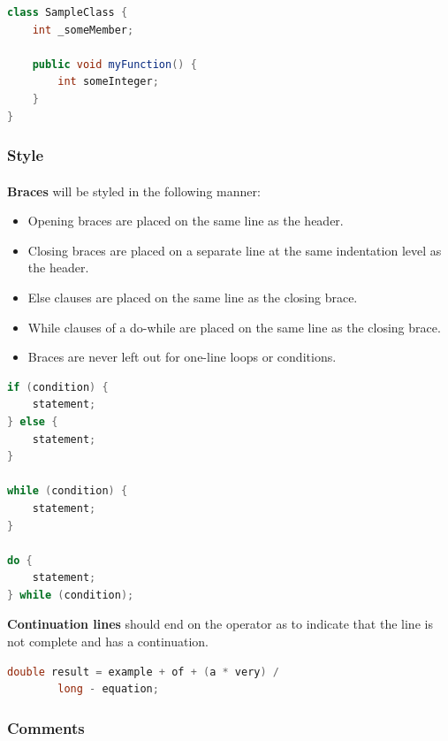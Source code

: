 \documentclass{article}
\begin{document}
    \begin{lstlisting}[language=java]
class SampleClass {
    int _someMember;

    public void myFunction() {
        int someInteger;
    }
}
    \end{lstlisting}

    \subsubsection{Style}
    \label{sec:cs-st}

    \paragraph{}
    \textbf{Braces} will be styled in the following manner:
    \begin{itemize}
        \item Opening braces are placed on the same line as the header.
        \item Closing braces are placed on a separate line at the same
                indentation level as the header.
        \item Else clauses are placed on the same line as the closing brace.
        \item While clauses of a do-while are placed on the same line as the
                closing brace.
        \item Braces are never left out for one-line loops or conditions.
    \end{itemize}

    \begin{lstlisting}[language=Java]
if (condition) {
    statement;
} else {
    statement;
}

while (condition) {
    statement;
}

do {
    statement;
} while (condition);
    \end{lstlisting}

    \textbf{Continuation lines} should end on the operator as to indicate that
    the line is not complete and has a continuation.

    \begin{lstlisting}[language=Java]
double result = example + of + (a * very) / 
        long - equation;
    \end{lstlisting}

    \subsubsection{Comments}
    \label{sec:cs-com}
\end{document}
